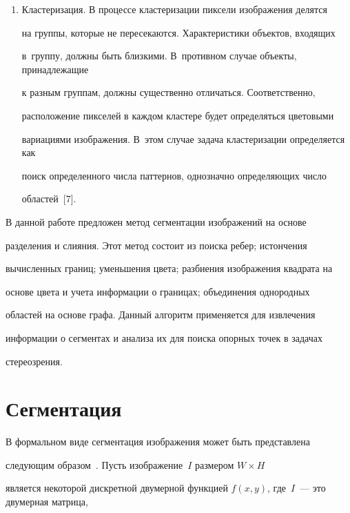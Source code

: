 \begin{enumerate}[1.]
гладкими и непрерывными. Для этого используют марковское случайное поле, 

стабилизированные уравнения обратной диффузии и др.

  \item Кластеризация. В процессе кластеризации пиксели изображения делятся 

на группы, которые не пересекаются. Характеристики объектов, входящих 

в~группу, должны быть близкими. В~противном случае объекты, принадлежащие 

к разным группам, должны существенно отличаться. Соответственно, 

расположение пикселей в каждом кластере будет определяться цветовыми 

вариациями изображения. В~этом случае задача кластеризации определяется как 

поиск определенного числа паттернов, однозначно определяющих число 

областей~[7].

  \end{enumerate}

  

  В данной работе предложен метод сегментации изображений на основе 

разделения и слияния. Этот метод состоит из поиска ребер; истончения 

вычисленных границ; уменьшения цвета; разбиения изображения квадрата на 

основе цвета и учета информации о границах; объединения однородных 

областей на основе графа. Данный алгоритм применяется для извлечения 

информации о сегментах и анализа их для поиска опорных точек в задачах 

стереозрения.

     

\section{Сегментация}



  В формальном виде сегментация изображения может быть представлена 

следующим образом~\cite{3-sor}. Пусть изображение~$I$ размером $W\times H$ 

является некоторой дискретной двумерной функцией $f(x,y)$, где~$I$~--- это двумерная мат\-ри\-ца, 

